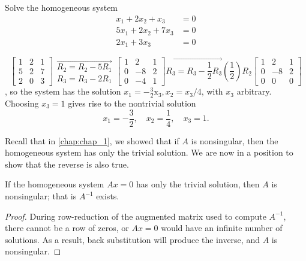 \documentclass[../main.tex]{subfiles}
\begin{document}
\begin{example} Solve the homogeneous system
$$
\begin{aligned}
x_{1}+2 x_{2}+x_{3}&=0 \\
5 x_{1}+2 x_{2}+7 x_{3}&=0 \\
2 x_{1}+3 x_{3}&=0
\end{aligned}
$$




$$
\left[\begin{array}{lll}
1 & 2 & 1 \\
5 & 2 & 7 \\
2 & 0 & 3
\end{array}\right] \begin{array}{l}
\overrightarrow{R_{2}=R_{2}-5 R_{1}}\\
R_{3}=R_{3}-2 R_{1}
\end{array}\left[\begin{array}{ccc}
1 & 2 & 1 \\
0 & -8 & 2 \\
0 & -4 & 1
\end{array}\right]
\overrightarrow{R_{3}=R_{3}- {\frac{1}{2}}R_{3}} \left(\frac{1}{2}\right) R_{2}\left[\begin{array}{ccc}
1 & 2 & 1 \\
0 & -8 & 2 \\
0 & 0 & 0
\end{array}\right]
$$,
so the system has the solution $x_{1}=-\frac{3}{2} \mathrm{x}_{3}, x_{2}=x_{3} / 4$, with $x_{3}$ arbitrary. Choosing $x_{3}=1$ gives rise to the nontrivial solution
$$
x_{1}=-\frac{3}{2}, \quad x_{2}=\frac{1}{4}, \quad x_{3}=1 .
$$
\end{example}

Recall that in \autoref{chap:chap_1}, we showed that if $A$ is nonsingular, then the homogeneous system has only the trivial solution. We are now in a position to show that the reverse is also true.

\begin{theorem}
	\label{theo:theo_2_1}
	If the homogeneous system $A x=0$ has only the trivial solution, then $A$ is nonsingular; that is $A^{-1}$ exists.
\end{theorem}

\begin{proof}
	During row-reduction of the augmented matrix used to compute $A^{-1}$, there cannot be a row of zeros, or $A x=0$ would have an infinite number of solutions. As a result, back substitution will produce the inverse, and $A$ is nonsingular.
\end{proof}
\end{document}
